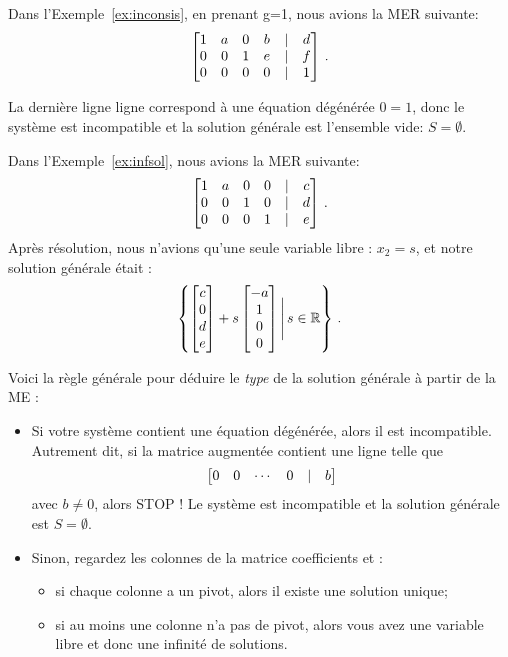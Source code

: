 \begin{myexample}  Dans l'Exemple~\ref{ex:inconsis}, en prenant g=1, nous avions la MER suivante:
$$
\left[ \begin{matrix} 1 & a & 0 & b & | & d\\
0 & 0 & 1 & e &|& f\\
0 & 0 & 0 & 0 &|& 1
 \end{matrix} \right]\,.
$$

La dernière ligne
ligne correspond à une équation dégénérée $0=1$, donc le système
est incompatible et la solution g\'en\'erale est l'ensemble vide: $S=\emptyset$. 
\end{myexample}


\begin{myexample} Dans l'Exemple~\ref{ex:infsol}, nous avions la MER suivante:
$$
\left[ \begin{matrix} 1 & a & 0 & 0 & | & c\\
0 & 0 & 1 & 0 & | & d\\
0 & 0 & 0 & 1 & | & e \end{matrix} \right]\,.
$$
Après résolution, nous n'avions qu'une seule variable libre : $x_2 = s$, et notre
solution générale était :
$$
\left\{  \left[ \begin{matrix} c\\0\\d\\e \end{matrix} \right]+s\left[ \begin{matrix} -a\\1\\0\\0 \end{matrix} \right] \Bigg|\, s\in\mathbb{R}\right\}\,.
$$
\end{myexample}


Voici la règle générale pour déduire le \emph{type} de la solution générale à partir de la ME :
\begin{itemize}
\item Si votre système contient une équation dégénérée, alors il est incompatible. Autrement dit, si la matrice augmentée contient une ligne telle que
$$
\left[ \begin{matrix}  0 & 0 & \cdots & 0 &|& b \end{matrix} \right]
$$
avec $b\neq 0$, alors STOP !  Le système est incompatible et la solution générale est $S=\emptyset$.

\item Sinon, regardez les colonnes de la matrice coefficients et :  
\begin{itemize}
\item si chaque colonne a un pivot, alors il existe une solution unique;
\item si au moins une colonne n'a pas de pivot, alors vous avez une variable libre et donc une infinité de solutions.\\
\end{itemize}
\end{itemize}

